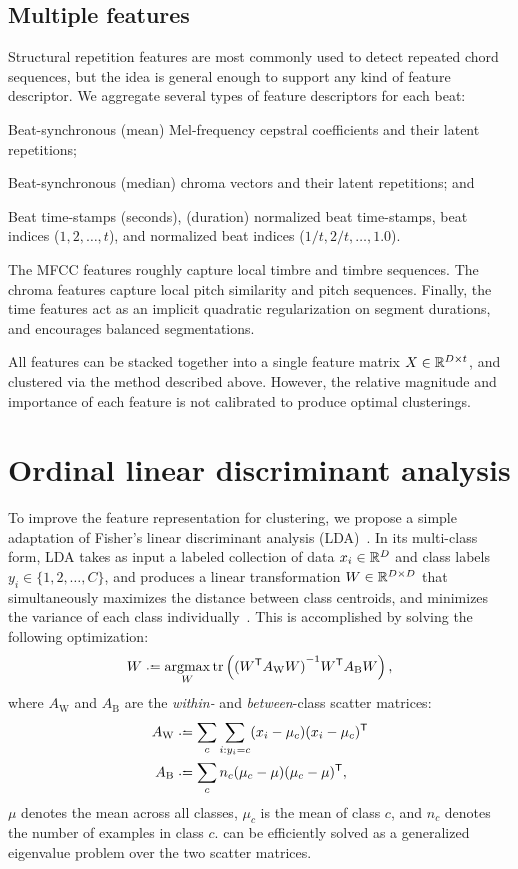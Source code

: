 \documentclass{article}
\begin{document}
\subsection{Multiple features}
Structural repetition features are most commonly used to detect repeated chord sequences, but the idea is general enough to
support any kind of feature descriptor.  We aggregate several types of feature descriptors for each beat:
\begin{description}\addtolength{\itemsep}{-0.5\baselineskip}%
\item[MFCC]   Beat-synchronous (mean) Mel-frequency cepstral coefficients and their latent repetitions;
\item[Chroma] Beat-synchronous (median) chroma vectors and their latent repetitions; and
\item[Time]   Beat time-stamps (seconds), (duration) normalized beat time-stamps, beat indices ($1, 2, \ldots, t$), 
and normalized beat indices ($1/t, 2/t, \ldots, 1.0$).
\end{description}
The MFCC features roughly capture local timbre and timbre sequences. The chroma features capture local pitch similarity and pitch
sequences. Finally, the time features act as an implicit quadratic regularization on segment durations, and encourages
balanced segmentations.

All features can be stacked together into a single feature matrix $X \in \mathbb{R}^{D\times t}$, and clustered via the method described
above. However, the relative magnitude and importance of each feature is not calibrated to produce optimal clusterings. 

\section{Ordinal linear discriminant analysis}
\label{sec:olda}
To improve the feature representation for clustering, we propose a simple adaptation of Fisher's linear discriminant
analysis (LDA)~\cite{fisher1936use}.  In its multi-class form, LDA takes as input a labeled collection of data $x_i \in \mathbb{R}^D$
and class labels $y_i \in \{1,2,\ldots, C\}$, and produces a linear transformation $W \in \mathbb{R}^{D\times D}$ that simultaneously 
maximizes the distance between class centroids, and minimizes the variance of each class 
individually~\cite{fukunaga1990introduction}. This is accomplished by solving the following optimization:
\begin{equation}
W \defeq \argmax_W \trace\left( {(W\trans A_\text{W} W)}^{-1} W\trans A_\text{B} W \right) \label{eq:fda},
\end{equation}
where $A_\text{W}$ and $A_\text{B}$ are the \emph{within-} and \emph{between}-class scatter matrices:
\begin{align*}
A_\text{W} & \defeq \sum_c \sum_{i : y_i = c} (x_i - \mu_c)(x_i - \mu_c)\trans\\
A_\text{B} & \defeq \sum_c n_c (\mu_c - \mu)(\mu_c - \mu)\trans,
\end{align*}
$\mu$ denotes the mean across all classes, $\mu_c$ is the mean of class $c$, and $n_c$ denotes the number of examples in class $c$.
 can be efficiently solved as a generalized eigenvalue problem over the two scatter matrices.
\end{document}
